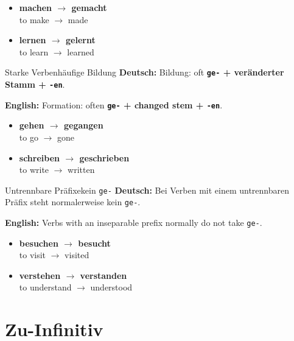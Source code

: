 \documentclass[a4paper,11pt]{article}
\newcommand{\GermanText}[1]{\textbf{Deutsch: }#1\par}
\newcommand{\EnglishText}[1]{{\small\color{SoftGray}\textbf{English: }#1\par}}
\newcommand{\ExampleItem}[2]{\item \textbf{#1}\\{\small\color{SoftGray}#2}}
\begin{document}
        \begin{exbox}
            \begin{itemize}
                \ExampleItem{machen $\rightarrow$ gemacht}{to make $\rightarrow$ made}
                \ExampleItem{lernen $\rightarrow$ gelernt}{to learn $\rightarrow$ learned}
            \end{itemize}
        \end{exbox}

        \begin{grammarentry}{Starke Verben}{häufige Bildung}
            \GermanText{Bildung: oft \textbf{\texttt{ge-} + veränderter Stamm + \texttt{-en}}.}
            \EnglishText{Formation: often \textbf{\texttt{ge-} + changed stem + \texttt{-en}}.}
        \end{grammarentry}

        \begin{exbox}
            \begin{itemize}
                \ExampleItem{gehen $\rightarrow$ gegangen}{to go $\rightarrow$ gone}
                \ExampleItem{schreiben $\rightarrow$ geschrieben}{to write $\rightarrow$ written}
            \end{itemize}
        \end{exbox}

        \begin{grammarentry}{Untrennbare Präfixe}{kein \texttt{ge-}}
            \GermanText{Bei Verben mit einem untrennbaren Präfix steht normalerweise kein \texttt{ge-}.}
            \EnglishText{Verbs with an inseparable prefix normally do not take \texttt{ge-}.}
        \end{grammarentry}

        \begin{exbox}
            \begin{itemize}
                \ExampleItem{besuchen $\rightarrow$ besucht}{to visit $\rightarrow$ visited}
                \ExampleItem{verstehen $\rightarrow$ verstanden}{to understand $\rightarrow$ understood}
            \end{itemize}
        \end{exbox}

    \section{Zu-Infinitiv}
\end{document}
